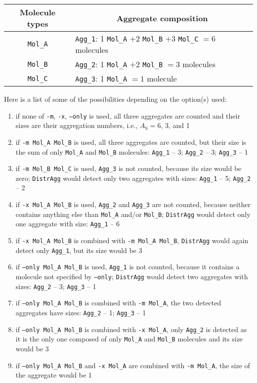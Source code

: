 \begin{longtable}{c|l}
  \toprule
  Molecule types & \multicolumn{1}{c}{Aggregate composition} \\
  \midrule
  \texttt{Mol\_A} & \texttt{Agg\_1}: 1 \texttt{Mol\_A} $+2$ \texttt{Mol\_B} $+3$ \texttt{Mol\_C} $=6$ molecules \\
  \texttt{Mol\_B} & \texttt{Agg\_2}: 1 \texttt{Mol\_A} $+2$ \texttt{Mol\_B} $=3$ molecules \\
  \texttt{Mol\_C} & \texttt{Agg\_3}: 1 \texttt{Mol\_A} $=1$ molecule \\
  \bottomrule
\end{longtable}

\noindent
Here is a list of some of the possibilities depending on the option(s)
used:
\begin{enumerate}[nosep]
  \item if none of \texttt{-m}, \texttt{-x}, \texttt{--only} is used, all
    three aggregates are counted and their sizes are their aggregation
    numbers, i.e., $A_{\text{S}}=6$, 3, and 1
  \item if \texttt{-m Mol\_A Mol\_B} is used, all three aggregates are
    counted, but their size is the sum of only \texttt{Mol\_A} and
    \texttt{Mol\_B} molecules: \texttt{Agg\_1} -- 3; \texttt{Agg\_2} -- 3;
    \texttt{Agg\_3} -- 1
  \item if \texttt{-m Mol\_B Mol\_C} is used, \texttt{Agg\_3} is not
    counted, because its size would be zero; \texttt{DistrAgg} would detect
    only two aggregates with sizes: \texttt{Agg\_1} -- 5; \texttt{Agg\_2} --
    2
  \item if \texttt{-x Mol\_A Mol\_B} is used, \texttt{Agg\_2} and
    \texttt{Agg\_3} are not counted, because neither contains anything else
    than \texttt{Mol\_A} and/or \texttt{Mol\_B}; \texttt{DistrAgg} would
    detect only one aggregate with size: \texttt{Agg\_1} -- 6
  \item if \texttt{-x Mol\_A Mol\_B} is combined with \texttt{-m Mol\_A
    Mol\_B}, \texttt{DistrAgg} would again detect only \texttt{Agg\_1}, but
    its size would be 3
  \item if \texttt{--only Mol\_A Mol\_B} is used, \texttt{Agg\_1} is not
    counted, because it contains a molecule not specified by
    \texttt{--only}; \texttt{DistrAgg} would detect two aggregates
    with sizes: \texttt{Agg\_2} -- 3; \texttt{Agg\_3} -- 1
  \item if \texttt{--only Mol\_A Mol\_B} is combined with \texttt{-m
    Mol\_A}, the two detected aggregates have sizes: \texttt{Agg\_2} -- 1;
    \texttt{Agg\_3} -- 1
  \item if \texttt{--only Mol\_A Mol\_B} is combined with \texttt{-x
    Mol\_A}, only \texttt{Agg\_2} is detected as it is the only one composed of
    only \texttt{Mol\_A} and \texttt{Mol\_B} molecules and its size would
    be 3
  \item if \texttt{--only Mol\_A Mol\_B} and \texttt{-x Mol\_A} are combined
    with \texttt{-m Mol\_A}, the size of the aggregate would be 1
\end{enumerate}

